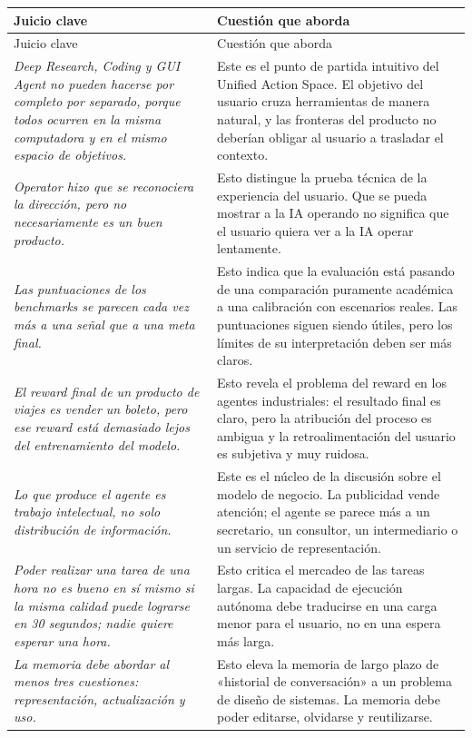 \documentclass[a4paper]{article}
\begin{document}
\begin{longtable}{>{\raggedright\arraybackslash}p{} >{\raggedright\arraybackslash}p{}}
\toprule
Juicio clave & Cuestión que aborda \\
\midrule
\endfirsthead
\toprule
Juicio clave & Cuestión que aborda \\
\midrule
\endhead
\textit{Deep Research, Coding y GUI Agent no pueden hacerse por completo por separado, porque todos ocurren en la misma computadora y en el mismo espacio de objetivos.} & Este es el punto de partida intuitivo del Unified Action Space. El objetivo del usuario cruza herramientas de manera natural, y las fronteras del producto no deberían obligar al usuario a trasladar el contexto. \\
\textit{Operator hizo que se reconociera la dirección, pero no necesariamente es un buen producto.} & Esto distingue la prueba técnica de la experiencia del usuario. Que se pueda mostrar a la IA operando no significa que el usuario quiera ver a la IA operar lentamente. \\
\textit{Las puntuaciones de los benchmarks se parecen cada vez más a una señal que a una meta final.} & Esto indica que la evaluación está pasando de una comparación puramente académica a una calibración con escenarios reales. Las puntuaciones siguen siendo útiles, pero los límites de su interpretación deben ser más claros. \\
\textit{El reward final de un producto de viajes es vender un boleto, pero ese reward está demasiado lejos del entrenamiento del modelo.} & Esto revela el problema del reward en los agentes industriales: el resultado final es claro, pero la atribución del proceso es ambigua y la retroalimentación del usuario es subjetiva y muy ruidosa. \\
\textit{Lo que produce el agente es trabajo intelectual, no solo distribución de información.} & Este es el núcleo de la discusión sobre el modelo de negocio. La publicidad vende atención; el agente se parece más a un secretario, un consultor, un intermediario o un servicio de representación. \\
\textit{Poder realizar una tarea de una hora no es bueno en sí mismo si la misma calidad puede lograrse en 30 segundos; nadie quiere esperar una hora.} & Esto critica el mercadeo de las tareas largas. La capacidad de ejecución autónoma debe traducirse en una carga menor para el usuario, no en una espera más larga. \\
\textit{La memoria debe abordar al menos tres cuestiones: representación, actualización y uso.} & Esto eleva la memoria de largo plazo de «historial de conversación» a un problema de diseño de sistemas. La memoria debe poder editarse, olvidarse y reutilizarse. \\

\end{longtable}
\end{document}
